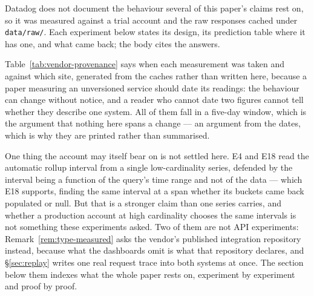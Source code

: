 
Datadog does not document the behaviour several of this paper's claims rest on, so it was
measured against a trial account and the raw responses cached under \texttt{data/raw/}.
Each experiment below states its design, its prediction table where it has one, and what
came back; the body cites the answers.

Table~\ref{tab:vendor-provenance} says when each measurement was taken and against which
site, generated from the caches rather than written here, because a paper measuring an
unversioned service should date its readings: the behaviour can change without notice,
and a reader who cannot date two figures cannot tell whether they describe one system.
All of them fall in a five-day window, which is the argument that nothing here spans a
change --- an argument from the dates, which is why they are printed rather than
summarised.

\begin{table}[htbp]\centering\footnotesize

\caption{Every measurement taken against the vendor's API, with the cache each one
wrote. \texttt{E7}'s second series carries a run identifier and no timestamp. The
integration-repository census behind Remark~\ref{rem:type-measured} is not here: it reads
published files rather than asking the account.}
\label{tab:vendor-provenance}
\end{table}

One thing the account may itself bear on is not settled here. E4 and E18 read the
automatic rollup interval from a single low-cardinality series, defended by the interval
being a function of the query's time range and not of the data --- which E18 supports,
finding the same interval at a span whether its buckets came back populated or null. But
that is a stronger claim than one series carries, and whether a production account at
high cardinality chooses the same intervals is not something these experiments asked. Two of them are not API experiments:
Remark~\ref{rem:type-measured} asks the vendor's published integration repository
instead, because what the dashboards omit is what that repository declares, and
\S\ref{sec:replay} writes one real request trace into both systems at once. The
section below them indexes what the whole paper rests on, experiment by experiment and
proof by proof.

















